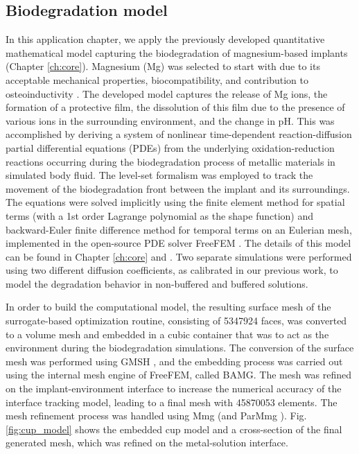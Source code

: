 \subsection{Biodegradation model}

In this application chapter, we apply the previously developed quantitative mathematical model capturing the biodegradation of magnesium-based implants (Chapter \ref{ch:core}). Magnesium (Mg) was selected to start with due to its acceptable mechanical properties, biocompatibility, and contribution to osteoinductivity \cite{Agarwal2016}. The developed model captures the release of Mg ions, the formation of a protective film,  the dissolution of this film due to the presence of various ions in the surrounding environment, and the change in pH. This was accomplished by deriving a system of nonlinear time-dependent reaction-diffusion partial differential equations (\gls{PDE}s) from the underlying oxidation-reduction reactions occurring during the biodegradation process of metallic materials in simulated body fluid. The level-set formalism was employed to track the movement of the biodegradation front between the implant and its surroundings. The equations were solved implicitly using the finite element method for spatial terms (with a 1st order Lagrange polynomial as the shape function) and backward-Euler finite difference method for temporal terms on an Eulerian mesh, implemented in the open-source \gls{PDE} solver FreeFEM \cite{Hecht2012}. The details of this model can be found in Chapter \ref{ch:core} and  \cite{Barzegari2021}. Two separate simulations were performed using two different diffusion coefficients, as calibrated in our previous work, to model the degradation behavior in non-buffered and buffered solutions.

In order to build the computational model, the resulting surface mesh of the surrogate-based optimization routine, consisting of \num{5347924} faces, was converted to a volume mesh and embedded in a cubic container that was to act as the environment during the biodegradation simulations. The conversion of the surface mesh was performed using GMSH \cite{Geuzaine2009}, and the embedding process was carried out using the internal mesh engine of FreeFEM, called BAMG. The mesh was refined on the implant-environment interface to increase the numerical accuracy of the interface tracking model, leading to a final mesh with \num{45870053} elements. The mesh refinement process was handled using Mmg \cite{Dapogny2014} (and ParMmg \cite{balarac:hal-03344779}). Fig. \ref{fig:cup_model} shows the embedded cup model and a cross-section of the final generated mesh, which was refined on the metal-solution interface.



